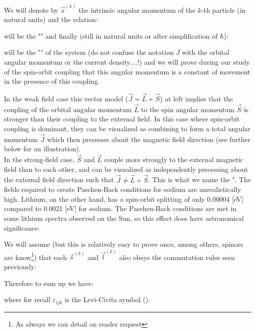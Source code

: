 	We will denote by $\vec{s}^{(k)}$ the intrinsic angular momentum of the $k$-th particle (in natural units) and the relation:
	
	will be the "\label{total spin}" and finally (still in natural units or after simplification of $\hbar$):
	
	will be the "" of the system (do not confuse the notation $J$ with the orbital angular momentum or the current density....!) and we will prove during our study of the spin-orbit coupling that this angular momentum is a constant of movement in the presence of this coupling.
	 \begin{tcolorbox}[title=Remark,colframe=black,arc=10pt]
	In the weak field case this vector model ($\vec{J}=\vec{L}+\vec{S}$) at left implies that the coupling of the orbital angular momentum $\vec{L}$ to the spin angular momentum $\vec{S}$ is stronger than their coupling to the external field. In this case where spin-orbit coupling is dominant, they can be visualized as combining to form a total angular momentum $\vec{J}$ which then precesses about the magnetic field direction (see further below for an illustration).\\
	
	In the strong-field case, $\vec{S}$ and $\vec{L}$ couple more strongly to the external magnetic field than to each other, and can be visualized as independently precessing about the external field direction such that $\vec{J}\neq \vec{L}+\vec{S}$. This is what we name the ". The fields required to create Paschen-Back conditions for sodium are unrealistically high. Lithium, on the other hand, has a spin-orbit splitting of only $0.00004$ [eV] compared to $0.0021$ [eV] for sodium. The Paschen-Back conditions are met in some lithium spectra observed on the Sun, so this effect does have astronomical significance.
	\end{tcolorbox}
	We will assume (but this is relatively easy to prove once, among others, spinors are know\footnote{As always we can detail on reader request}) that each $\vec{s}^{(k)}$ and $\vec{l}^{(k)}$ also obeys the commutation rules seen previously:
	
	Therefore to sum up we have:
	
	where for recall $\varepsilon_{ijk}$ is the Levi-Civita symbol ().
	
